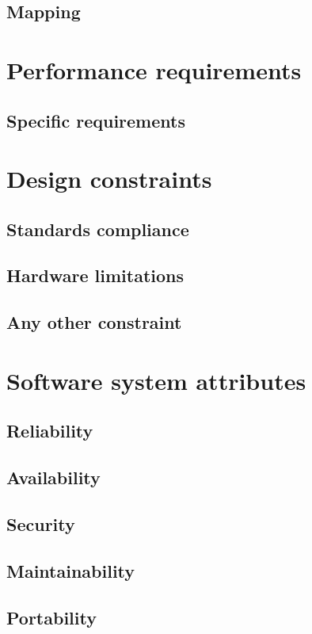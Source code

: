 \subsection{Mapping}

\section{Performance requirements}

\subsection{Specific requirements}

\section{Design constraints}
\subsection{Standards compliance}
\subsection{Hardware limitations}
\subsection{Any other constraint}

\section{Software system attributes}
\subsection{Reliability}
\subsection{Availability}
\subsection{Security}
\subsection{Maintainability}
\subsection{Portability}